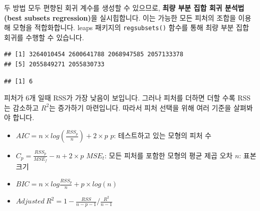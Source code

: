 \documentclass[12pt,]{book}
\newenvironment{Shaded}{\begin{snugshade}}{\end{snugshade}}
\newcommand{\DataTypeTok}[1]{\textcolor[rgb]{0.13,0.29,0.53}{#1}}
\newcommand{\KeywordTok}[1]{\textcolor[rgb]{0.13,0.29,0.53}{\textbf{#1}}}
\newcommand{\NormalTok}[1]{#1}
\newcommand{\OperatorTok}[1]{\textcolor[rgb]{0.81,0.36,0.00}{\textbf{#1}}}
\newcommand{\StringTok}[1]{\textcolor[rgb]{0.31,0.60,0.02}{#1}}
\begin{document}
두 방법 모두 편향된 회귀 계수를 생성할 수 있으므로, \textbf{최량 부분 집합 회귀 분석법(best subsets regression)}을 실시힙합니다. 이는 가능한 모든 피처의 조합을 이용해 모형을 적합화합니다. leaps 패키지의 \texttt{regsubsets()} 함수를 통해 최량 부분 집합 회귀를 수행할 수 있습니다.

\begin{Shaded}
\end{Shaded}

\begin{verbatim}
## [1] 3264010454 2600641788 2068947585 2057133378
## [5] 2055849271 2055830733
\end{verbatim}

\begin{Shaded}
\end{Shaded}

\begin{verbatim}
## [1] 6
\end{verbatim}

피처가 6개 일때 RSS가 가장 낮음이 보입니다. 그러나 피처를 더하면 더할 수록 RSS는 감소하고 \(R^2\)는 증가하기 마련입니다. 따라서 피처 선택을 위해 여러 기준을 살펴봐야 합니다.

\begin{itemize}
\item
  \(AIC = n \times log(\frac{RSS_p}{n}) + 2 \times p\) \(p\): 테스트하고 있는 모형의 피처 수
\item
  \(C_p = \frac{RSS_p}{MSE_f} - n + 2 \times p\) \(MSE_t\): 모든 피처를 포함한 모형의 평균 제곱 오차 \(n\): 표본 크기
\item
  \(BIC = n \times log \frac{RSS_p}{n} + p \times log(n)\)
\item
  \(Adjusted\ R^2 = 1 - \frac{RSS}{n-p-1} / \frac{R^2}{n-1}\)
\end{itemize}
\end{document}

